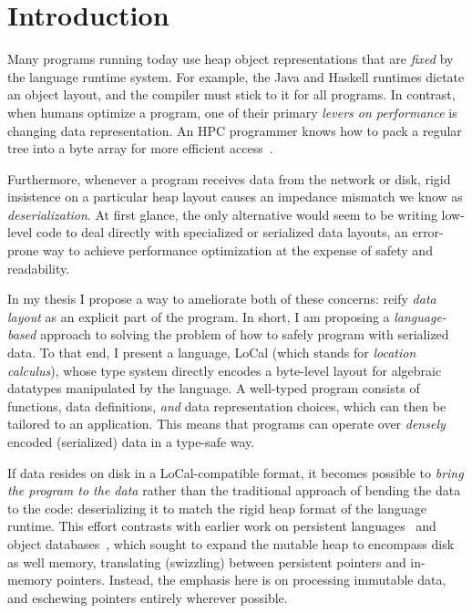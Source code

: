 \documentclass[showabstract,showacknowledgments,showpreface,showdedication,school]{iuphd}
\theoremstyle{nonumberplain}
\newcommand{\sysname}[0]{LoCal\xspace}
\newcommand{\ourcalc}[0]{\sysname}
\begin{document}
\newpage


\tableofcontents

\chapter{Introduction}\label{chapter:intro}

Many programs running today use heap object representations that are \emph{fixed}
by the language runtime system.
For example, the Java and Haskell runtimes dictate an object layout, and the
compiler must stick to it for all programs.
In contrast, when humans optimize a program, one of their primary {\em levers on
performance} is changing data representation.  An HPC programmer
knows how to pack a regular tree into a byte array for more efficient
access~\cite{makino90,goldfarb13sc,Meyerovich2011}.

Furthermore, whenever a program receives data from the network or
disk, rigid insistence on a particular heap layout causes an impedance mismatch
we know as {\em deserialization}.
At first glance, the only alternative would seem to be writing low-level code to
deal directly with specialized or serialized data layouts, an error-prone way to
achieve performance optimization at the expense of safety and readability.

In my thesis I propose a way to ameliorate both of these concerns: reify
\emph{data layout} as an explicit part of the program. In short, I am proposing
a \emph{language-based} approach to solving the problem of how to safely program
with serialized data. To that end,
I present a language,
\ourcalc{} (which stands for \emph{location calculus}), whose type system directly
encodes a byte-level layout for algebraic datatypes manipulated by the language.
A well-typed program consists of functions, data definitions, \emph{and}
data representation choices, which
can then be tailored to an application.
This means that programs can operate over {\em densely}
encoded (serialized) data in a type-safe way.

{If data resides on disk in a \ourcalc-compatible format}, it becomes
possible to {\em bring the program to the data} rather than the traditional
approach of bending the data to the code: deserializing it to match the rigid
heap format of the language runtime.
{This effort contrasts with earlier work on persistent
languages~\cite{persistent-java,persistent-objects-thor} and object databases~\cite{object-fault-handling},
which sought to expand the mutable heap to encompass disk as well memory,
translating (swizzling) between persistent pointers and in-memory pointers.  Instead, the
emphasis here is on processing immutable data, and eschewing pointers entirely
wherever possible.}
\end{document}
